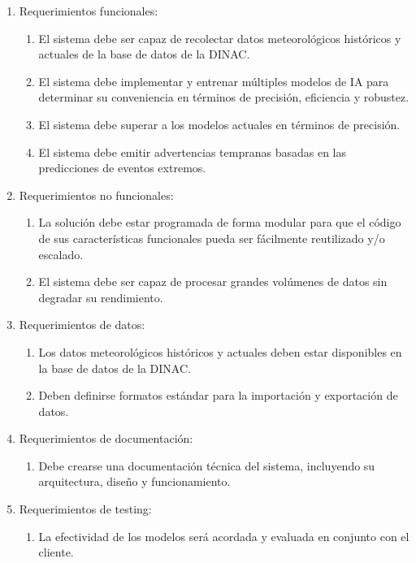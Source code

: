 \documentclass[
11pt, %
codirector, %
]{charter}
\begin{document}
\begin{enumerate}
	\item Requerimientos funcionales:
		\begin{enumerate}
			\item El sistema debe ser capaz de recolectar datos meteorológicos históricos y actuales de la base de datos de la DINAC.
			\item El sistema debe implementar y entrenar múltiples modelos de IA para determinar su conveniencia en términos de precisión, eficiencia y robustez.
			\item El sistema debe superar a los modelos actuales en términos de precisión.
			\item El sistema debe emitir advertencias tempranas basadas en las predicciones de eventos extremos.
		\end{enumerate}
	\item Requerimientos no funcionales:
		\begin {enumerate}
			\item La solución debe estar programada de forma modular para que el código de sus características funcionales pueda ser fácilmente reutilizado y/o escalado.
			\item El sistema debe ser capaz de procesar grandes volúmenes de datos sin degradar su rendimiento.
		\end{enumerate}
	\item Requerimientos de datos:
		\begin {enumerate}
			\item Los datos meteorológicos históricos y actuales deben estar disponibles en la base de datos de la DINAC.
			\item Deben definirse formatos estándar para la importación y exportación de datos.
		\end{enumerate}
	\item Requerimientos de documentación:
		\begin{enumerate}
			\item Debe crearse una documentación técnica del sistema, incluyendo su arquitectura, diseño y funcionamiento.
		\end{enumerate}
	\item Requerimientos de testing:
		\begin{enumerate}
			\item La efectividad de los modelos será acordada y evaluada en conjunto con el cliente.
		\end{enumerate}
\end{enumerate}
\end{document}
